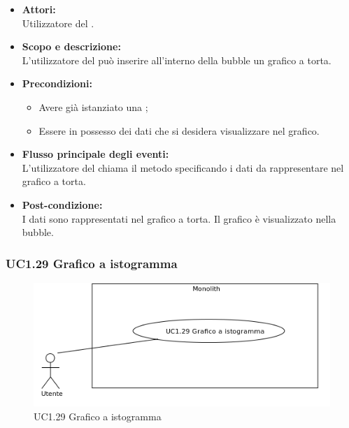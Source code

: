 \begin{itemize}
	\item \textbf{Attori:}
	\\Utilizzatore del .
	\item \textbf{Scopo e descrizione:} 
	\\L’utilizzatore del  può inserire all'interno della bubble un grafico a torta.
	\item \textbf{Precondizioni:}
	\begin{itemize}
		\item Avere già istanziato una ;
		\item Essere in possesso dei dati che si desidera visualizzare nel grafico.
	\end{itemize}
	\item \textbf{Flusso principale degli eventi:}
	\\L’utilizzatore del  chiama il metodo specificando i dati da rappresentare nel grafico a torta.
	\item \textbf{Post-condizione:}
	\\I dati sono rappresentati nel grafico a torta. Il grafico è visualizzato nella bubble.
\end{itemize}

\subsubsection{UC1.29 Grafico a istogramma} \label{UC1.29}

\begin{figure}[H]
	\centering
	\includegraphics[width=15cm]{../../documenti/AnalisiDeiRequisiti/Diagrammi_img/uc1_29.png}
	\caption{UC1.29 Grafico a istogramma}
\end{figure}

